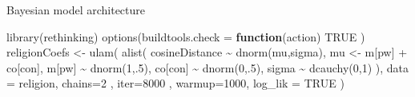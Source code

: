 \documentclass[
  10pt,
  ignorenonframetext,
  x11names, dvipsnames, bibspacing,natbib]{beamer}
\newenvironment{Shaded}{\begin{snugshade}}{\end{snugshade}}
\newcommand{\AttributeTok}[1]{\textcolor[rgb]{0.77,0.63,0.00}{#1}}
\newcommand{\ConstantTok}[1]{\textcolor[rgb]{0.00,0.00,0.00}{#1}}
\newcommand{\ControlFlowTok}[1]{\textcolor[rgb]{0.13,0.29,0.53}{\textbf{#1}}}
\newcommand{\DecValTok}[1]{\textcolor[rgb]{0.00,0.00,0.81}{#1}}
\newcommand{\FunctionTok}[1]{\textcolor[rgb]{0.00,0.00,0.00}{#1}}
\newcommand{\NormalTok}[1]{#1}
\newcommand{\OtherTok}[1]{\textcolor[rgb]{0.56,0.35,0.01}{#1}}
\newcommand{\SpecialCharTok}[1]{\textcolor[rgb]{0.00,0.00,0.00}{#1}}
\begin{document}
\begin{frame}[fragile]{Bayesian model architecture}
\protect\hypertarget{bayesian-model-architecture-1}{}
\vspace{1mm}
\footnotesize

\begin{Shaded}
\begin{Highlighting}[]
\FunctionTok{library}\NormalTok{(rethinking)}
\FunctionTok{options}\NormalTok{(}\AttributeTok{buildtools.check =} \ControlFlowTok{function}\NormalTok{(action) }\ConstantTok{TRUE}\NormalTok{ )}
\NormalTok{religionCoefs }\OtherTok{\textless{}{-}} \FunctionTok{ulam}\NormalTok{(}
  \FunctionTok{alist}\NormalTok{(}
\NormalTok{    cosineDistance }\SpecialCharTok{\textasciitilde{}} \FunctionTok{dnorm}\NormalTok{(mu,sigma),}
\NormalTok{    mu }\OtherTok{\textless{}{-}}\NormalTok{ m[pw] }\SpecialCharTok{+}\NormalTok{ co[con],}
\NormalTok{    m[pw] }\SpecialCharTok{\textasciitilde{}} \FunctionTok{dnorm}\NormalTok{(}\DecValTok{1}\NormalTok{,.}\DecValTok{5}\NormalTok{),}
\NormalTok{    co[con] }\SpecialCharTok{\textasciitilde{}} \FunctionTok{dnorm}\NormalTok{(}\DecValTok{0}\NormalTok{,.}\DecValTok{5}\NormalTok{),}
\NormalTok{    sigma }\SpecialCharTok{\textasciitilde{}} \FunctionTok{dcauchy}\NormalTok{(}\DecValTok{0}\NormalTok{,}\DecValTok{1}\NormalTok{)}
\NormalTok{  ),}
  \AttributeTok{data =}\NormalTok{ religion,}
  \AttributeTok{chains=}\DecValTok{2}\NormalTok{ , }\AttributeTok{iter=}\DecValTok{8000}\NormalTok{ , }\AttributeTok{warmup=}\DecValTok{1000}\NormalTok{, }
  \AttributeTok{log\_lik =} \ConstantTok{TRUE}
\NormalTok{)}
\end{Highlighting}
\end{Shaded}

\normalsize
\end{frame}
\end{document}
